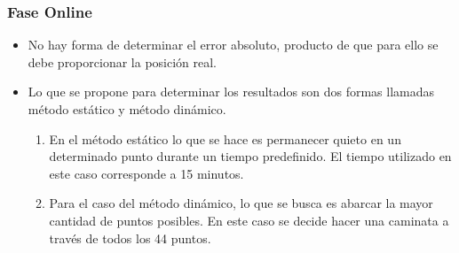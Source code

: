 \documentclass[mathserif]{beamer}
\begin{document}
\begin{frame}
\frametitle{Fase Online}

\begin{itemize}
\item No hay forma de determinar el error absoluto, producto de que para ello se debe proporcionar la posición real.

\pause
\item Lo que se propone para determinar los resultados son dos formas llamadas método estático y método dinámico.
\begin{enumerate}[1]
\pause
\item En el método estático lo que se hace es permanecer quieto en un determinado punto durante un tiempo predefinido. El tiempo utilizado en este caso corresponde a 15 minutos.

\pause
\item Para el caso del método dinámico, lo que se busca es abarcar la mayor cantidad de puntos posibles. En este caso se decide hacer una caminata a través de todos los 44 puntos.
\end{enumerate}
\end{itemize}


\end{frame}
\end{document}
